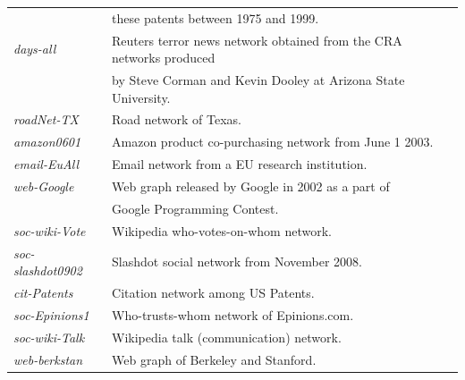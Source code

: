 \begin{table}[!h]
\begin{tabular}{ll}
& these patents between 1975 and 1999. 	\\
{\it days-all} \cite{corman2002}	& Reuters terror news network obtained from the CRA networks produced \\
& by Steve Corman and Kevin Dooley at Arizona State University.	\\\hline
{\it roadNet-TX} \cite{Leskovec:2005:GOT:1081870.1081893}	& Road network of Texas.	\\
{\it amazon0601} \cite{leskovec2007}	& Amazon product co-purchasing network from June 1 2003. \\
{\it email-EuAll} \cite{leskovec2007-2}	& Email network from a EU research institution.	\\
{\it web-Google} \cite{web-google}	& Web graph released by Google in 2002 as a part of \\
& Google Programming Contest.	\\
{\it soc-wiki-Vote} \cite{leskovec2010}	& Wikipedia who-votes-on-whom network.	\\
{\it soc-slashdot0902} \cite{Leskovec:2005:GOT:1081870.1081893}	& Slashdot social network from November 2008.\\
{\it cit-Patents} \cite{hall2001}	& Citation network among US Patents.	\\
{\it soc-Epinions1} \cite{richardson2003}	&	Who-trusts-whom network of Epinions.com. \\
{\it soc-wiki-Talk} \cite{leskovec2010}	&	Wikipedia talk (communication) network. \\
{\it web-berkstan} \cite{Leskovec:2005:GOT:1081870.1081893}	& Web graph of Berkeley and Stanford.	\\\hline\hline

\end{tabular}
\end{table}

